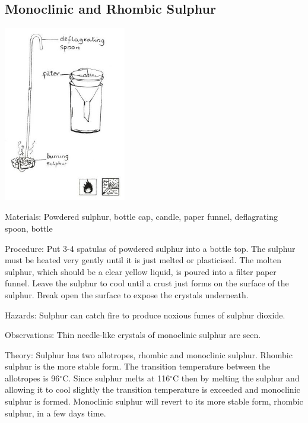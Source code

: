 \begin{multicols}{2}
\subsection{Monoclinic and Rhombic Sulphur}

\begin{center}
\includegraphics[width=0.4\textwidth]{./img/source/sulphur-monoclinic.jpg}
\end{center}

\begin{description*}
\item[Materials:]{Powdered sulphur, bottle cap, candle, paper funnel, deflagrating spoon, bottle}
\item[Procedure:]{Put 3-4 spatulas of powdered sulphur into a
bottle top. The sulphur must be heated very
gently until it is just melted or plasticised. The
molten sulphur, which should be a clear yellow
liquid, is poured into a filter paper funnel. Leave
the sulphur to cool until a crust just forms on the
surface of the sulphur. Break open the surface to
expose the crystals underneath.}
\item[Hazards:]{Sulphur can catch fire to produce noxious
fumes of sulphur dioxide.}
\item[Observations:]{Thin needle-like crystals of monoclinic
sulphur are seen.}
\item[Theory:]{Sulphur has two allotropes, rhombic and
monoclinic sulphur. Rhombic sulphur is the
more stable form. The transition temperature
between the allotropes is 96$^\circ$C. Since sulphur
melts at 116$^\circ$C then by melting the sulphur and
allowing it to cool slightly the transition
temperature is exceeded and monoclinic sulphur
is formed. Monoclinic sulphur will revert to its
more stable form, rhombic sulphur, in a few
days time.}
\end{description*}


\end{multicols}
